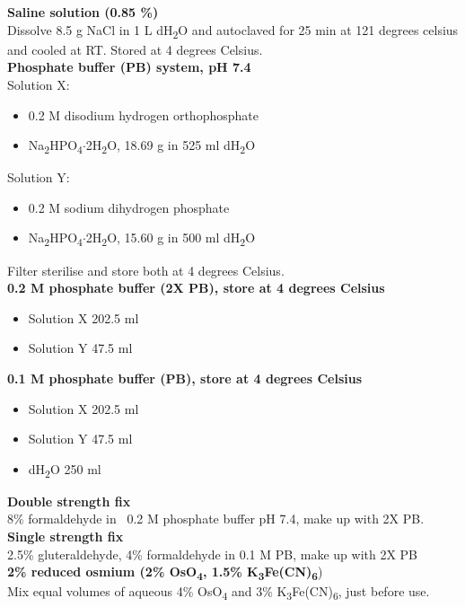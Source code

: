 \noindent
\textbf{Saline solution (0.85 \%)} \\
Dissolve 8.5 g NaCl in 1 L dH\textsubscript{2}O and autoclaved for 25 min at 121 degrees celsius and cooled at RT.
Stored at 4 degrees Celsius. \\

\noindent
\textbf{Phosphate buffer (PB) system, pH 7.4} \\
Solution X:
\begin{itemize}
\item 0.2 M disodium hydrogen orthophosphate 
\item Na\textsubscript{2}HPO\textsubscript{4}$\cdot$2H\textsubscript{2}O, 18.69 g in 525 ml dH\textsubscript{2}O 
\end{itemize}
Solution Y:
\begin{itemize}
\item 0.2 M sodium dihydrogen phosphate 
\item Na\textsubscript{2}HPO\textsubscript{4}$\cdot$2H\textsubscript{2}O, 15.60 g in 500 ml dH\textsubscript{2}O 
\end{itemize}
Filter sterilise and store both at 4 degrees Celsius. \\

\noindent
\textbf{0.2 M phosphate buffer (2X PB), store at 4 degrees Celsius}
\begin{itemize}
\item Solution X 202.5 ml 
\item Solution Y 47.5 ml 
\end{itemize}

\noindent
\textbf{0.1 M phosphate buffer (PB), store at 4 degrees Celsius}
\begin{itemize}
\item Solution X 202.5 ml 
\item Solution Y 47.5 ml 
\item dH\textsubscript{2}O 250 ml 
\end{itemize}

\noindent
\textbf{Double strength fix} \\
8\% formaldehyde in ~0.2 M phosphate buffer pH 7.4, make up with 2X PB. \\

\noindent
\textbf{Single strength fix} \\
2.5\% gluteraldehyde, 4\% formaldehyde in 0.1 M PB, make up with 2X PB \\

\noindent
\textbf{2\% reduced osmium (2\% OsO\textsubscript{4}, 1.5\% K\textsubscript{3}Fe(CN)\textsubscript{6}}) \\
Mix equal volumes of aqueous 4\% OsO\textsubscript{4} and 3\% K\textsubscript{3}Fe(CN)\textsubscript{6}, just before use. \\

